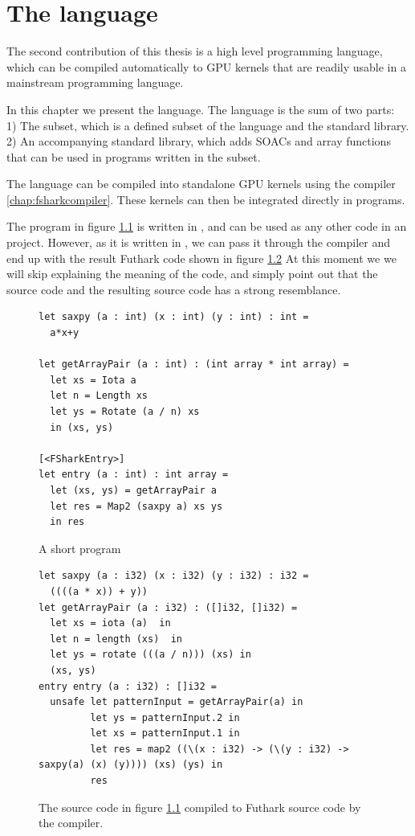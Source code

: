 \chapter{The \fshark{} language}
\label{chap:fsharklanguage}
The second contribution of this thesis is a high level programming language,
which can be compiled automatically to GPU kernels that are readily usable in
a mainstream programming language.

In this chapter we present the \fshark{} language.
The \fshark{} language is the sum of two parts: \\
1) The \fshark{} subset, which is a defined subset of the \fsharp{} language and
the \fsharp{} standard library.\\
2) An accompanying standard library, which adds SOACs and array functions that
can be used in programs written in the \fshark{} subset.

The \fshark{} language can be compiled into standalone GPU kernels using the
\fshark{} compiler \ref{chap:fsharkcompiler}. These kernels can then be integrated directly in
\fsharp{} programs.

The program in figure \ref{fig:shortfsharkprogram0'} is written in \fshark{},
and can be used as any other \fsharp{} code in an \fsharp{} project.
However, as it is written in \fshark{}, we can pass it through the \fshark{}
compiler and end up with the result Futhark code shown in figure \ref{fig:shortfsharkprogram1'}
At this moment we we will skip explaining the meaning of the code, and simply
point out that the \fshark{} source code and the resulting source code has a
strong resemblance.
\begin{figure}[H]
  \centering
\begin{verbatim}
let saxpy (a : int) (x : int) (y : int) : int =
  a*x+y

let getArrayPair (a : int) : (int array * int array) =
  let xs = Iota a
  let n = Length xs
  let ys = Rotate (a / n) xs
  in (xs, ys)

[<FSharkEntry>]
let entry (a : int) : int array =
  let (xs, ys) = getArrayPair a
  let res = Map2 (saxpy a) xs ys
  in res
\end{verbatim}
  \caption{A short \fshark{} program}
  \label{fig:shortfsharkprogram0'}
\end{figure}

\begin{figure}[H]
  \centering
  \begin{lstlisting}[language=Futhark, breaklines]
let saxpy (a : i32) (x : i32) (y : i32) : i32 =
  ((((a * x)) + y))
let getArrayPair (a : i32) : ([]i32, []i32) =
  let xs = iota (a)  in
  let n = length (xs)  in
  let ys = rotate (((a / n))) (xs) in
  (xs, ys)
entry entry (a : i32) : []i32 =
  unsafe let patternInput = getArrayPair(a) in
         let ys = patternInput.2 in
         let xs = patternInput.1 in
         let res = map2 ((\(x : i32) -> (\(y : i32) -> saxpy(a) (x) (y)))) (xs) (ys) in
         res
\end{lstlisting}
  \caption{The source code in figure \ref{fig:shortfsharkprogram0'} compiled to
    Futhark source code by the \fshark{} compiler.}
  \label{fig:shortfsharkprogram1'}
\end{figure}

